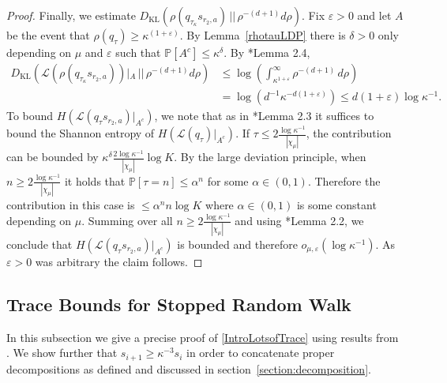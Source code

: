 \documentclass[10pt, english,oneside,reqno]{amsart}
\theoremstyle{plain}
\theoremstyle{remark}
\numberwithin{equation}{section}
\numberwithin{figure}{section}
\newcommand{\eps}{\varepsilon}
\begin{document}
\begin{proof}
    Finally, we estimate $D_{\mathrm{KL}}(\rho(q_{\tau_{\kappa}} s_{r_2,a})\, || \, \rho^{-(d + 1)}d\rho)$.  Fix $\eps > 0$ and let $A$ be the event that $\rho(q_{\tau}) \geq \kappa^{(1 + \eps)}.$ By Lemma~\ref{rhotauLDP} there is $\delta > 0$ only depending on $\mu$ and $\eps$ such that $\mathbb{P}[A^c] \leq \kappa^{\delta}$. By \cite{KittleKoglerEntropy}*{Lemma 2.4}, 
    \begin{align*}
        D_{\mathrm{KL}}(\mathcal{L}(\rho(q_{\tau_{\kappa}} s_{r_2,a}))|_A\, || \, \rho^{-(d + 1)}d\rho) &\leq \log\left( \int_{\kappa^{1 + \eps}}^{\infty} \rho^{-(d + 1)} \, d\rho \right) \\ &= \log\left( d^{-1}\kappa^{-d(1 + \eps)} \right) \leq  d(1 + \eps)\log \kappa^{-1}.
    \end{align*}
    To bound $H(\mathcal{L}(q_{\tau}s_{r_2,a})|_{A^c})$, we note that as in \cite{KittleKoglerEntropy}*{Lemma 2.3} it suffices to bound the Shannon entropy of $H(\mathcal{L}(q_{\tau})|_{A^c})$. If $\tau \leq 2\frac{\log \kappa^{-1}}{|\chi_{\mu}|}$, the contribution can be bounded by $\kappa^{\delta}\frac{2\log \kappa^{-1}}{|\chi_{\mu}|}\log K$. By the large deviation principle, when $n \geq 2\frac{\log \kappa^{-1}}{|\chi_{\mu}|}$ it holds that $\mathbb{P}[\tau = n] \leq \alpha^n$ for some $\alpha \in (0,1)$. Therefore the contribution in this case is $\leq \alpha^n n \log K$ where $\alpha \in (0,1)$ is some constant depending on $\mu$. Summing over all $n \geq 2\frac{\log \kappa^{-1}}{|\chi_{\mu}|}$ and using \cite{KittleKoglerEntropy}*{Lemma 2.2}, we conclude that $H(\mathcal{L}(q_{\tau}s_{r_2,a})|_{A^c})$ is bounded and therefore $o_{\mu,\eps}(\log \kappa^{-1})$. As $\eps > 0$ was arbitrary the claim follows. 
\end{proof}



\subsection{Trace Bounds for Stopped Random Walk}

In this subsection we give a precise proof of \eqref{IntroLotsofTrace} using results from \cite{KittleKoglerDimension}. We show further that $s_{i + 1} \geq \kappa^{-3}s_i$ in order to concatenate proper decompositions as defined and discussed in section~\ref{section:decomposition}.
\end{document}
